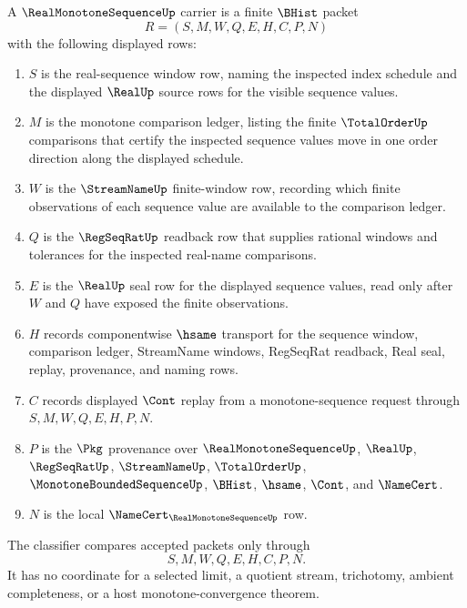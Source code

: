 \begin{definition}
\label{def:real-monotone-sequence-carrier}
A $\RealMonotoneSequenceUp$ carrier is a finite $\BHist$ packet
$$
R=(S,M,W,Q,E,H,C,P,N)
$$
with the following displayed rows:
\begin{enumerate}
\item $S$ is the real-sequence window row, naming the inspected index schedule and the displayed $\RealUp$ source rows for the visible sequence values.
\item $M$ is the monotone comparison ledger, listing the finite $\TotalOrderUp$ comparisons that certify the inspected sequence values move in one order direction along the displayed schedule.
\item $W$ is the $\StreamNameUp$ finite-window row, recording which finite observations of each sequence value are available to the comparison ledger.
\item $Q$ is the $\RegSeqRatUp$ readback row that supplies rational windows and tolerances for the inspected real-name comparisons.
\item $E$ is the $\RealUp$ seal row for the displayed sequence values, read only after $W$ and $Q$ have exposed the finite observations.
\item $H$ records componentwise $\hsame$ transport for the sequence window, comparison ledger, StreamName windows, RegSeqRat readback, Real seal, replay, provenance, and naming rows.
\item $C$ records displayed $\Cont$ replay from a monotone-sequence request through $S,M,W,Q,E,H,P,N$.
\item $P$ is the $\Pkg$ provenance over $\RealMonotoneSequenceUp$, $\RealUp$, $\RegSeqRatUp$, $\StreamNameUp$, $\TotalOrderUp$, $\MonotoneBoundedSequenceUp$, $\BHist$, $\hsame$, $\Cont$, and $\NameCert$.
\item $N$ is the local $\NameCert_{\RealMonotoneSequenceUp}$ row.
\end{enumerate}
The classifier compares accepted packets only through
$$
S,M,W,Q,E,H,C,P,N.
$$
It has no coordinate for a selected limit, a quotient stream, trichotomy, ambient completeness, or a host monotone-convergence theorem.
\end{definition}

